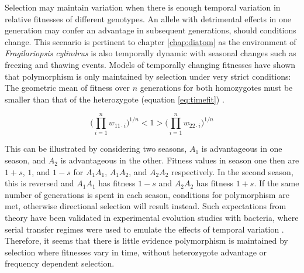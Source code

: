 Selection may maintain variation when there is enough temporal variation in relative fitnesses of different genotypes.
An allele with detrimental effects in one generation may confer an advantage in subsequent generations, should conditions change.
This scenario is pertinent to chapter \ref{chap:diatom} as the environment of \textit{Fragilariopsis cylindrus} is also temporally dynamic with seasonal changes such as freezing and thawing events.
Models of temporally changing fitnesses have shown that polymorphism is only maintained by selection under very strict conditions:
The geometric mean of fitness over $n$ generations for both homozygotes must be smaller than that of the heterozygote (equation \ref{eq:timefit}) \parencite{Haldane1963}. 

\begin{equation} \label{eq:timefit}
\Bigg( \prod_{i=1}^{n} w_{11\cdot i} \Bigg)^{1/n} < 1 > \Bigg( \prod_{i=1}^{n} w_{22\cdot i} \Bigg)^{1/n}
\end{equation}

This can be illustrated by considering two seasons, $A_1$ is advantageous in one season, and $A_2$ is advantageous in the other.
Fitness values in season one then are $1+s$, $1$, and $1-s$ for $A_1A_1$, $A_1A_2$, and $A_2A_2$ respectively.
In the second season, this is reversed and $A_1A_1$ has fitness $1-s$ and $A_2A_2$ has fitness $1+s$.
If the same number of generations is spent in each season, conditions for polymorphism are met, otherwise directional selection will result instead.
Such expectations from theory have been validated in experimental evolution studies with bacteria, where serial transfer regimes were used to emulate the effects of temporal variation \parencite{Rainey2000}.
Therefore, it seems that there is little evidence polymorphism is maintained by selection where fitnesses vary in time, without heterozygote advantage or frequency dependent selection.
